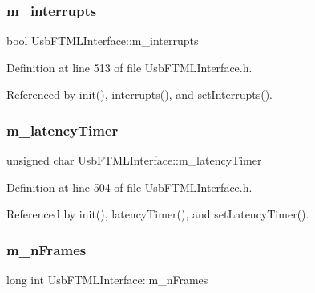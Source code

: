 \subsubsection{\texorpdfstring{m\+\_\+interrupts}{m\_interrupts}}
{\footnotesize\ttfamily bool Usb\+F\+T\+M\+L\+Interface\+::m\+\_\+interrupts\hspace{0.3cm}{\ttfamily [private]}}



Definition at line 513 of file Usb\+F\+T\+M\+L\+Interface.\+h.



Referenced by init(), interrupts(), and set\+Interrupts().

\mbox{\label{classUsbFTMLInterface_a28342ea2c00af670f1376aaa36ad0236}} 
\subsubsection{\texorpdfstring{m\+\_\+latency\+Timer}{m\_latencyTimer}}
{\footnotesize\ttfamily unsigned char Usb\+F\+T\+M\+L\+Interface\+::m\+\_\+latency\+Timer\hspace{0.3cm}{\ttfamily [private]}}



Definition at line 504 of file Usb\+F\+T\+M\+L\+Interface.\+h.



Referenced by init(), latency\+Timer(), and set\+Latency\+Timer().

\mbox{\label{classUsbFTMLInterface_ac7b9fb80fb8653a366c53ce3567cb823}} 
\subsubsection{\texorpdfstring{m\+\_\+n\+Frames}{m\_nFrames}}
{\footnotesize\ttfamily long int Usb\+F\+T\+M\+L\+Interface\+::m\+\_\+n\+Frames\hspace{0.3cm}{\ttfamily [private]}}



